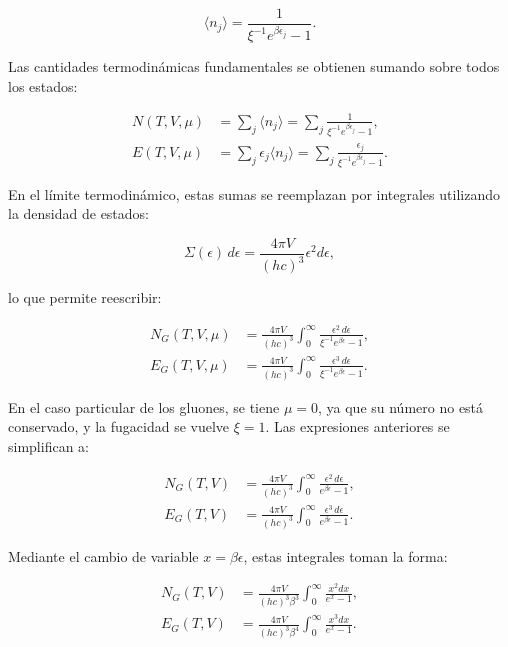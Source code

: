 \begin{equation}
\langle n_j \rangle = \frac{1}{\xi^{-1} e^{\beta \epsilon_j} - 1}.
\end{equation}

Las cantidades termodinámicas fundamentales se obtienen sumando sobre todos los estados:

\begin{align}
N(T,V,\mu) &= \sum_j \langle n_j \rangle = \sum_j \frac{1}{\xi^{-1} e^{\beta \epsilon_j} - 1}, \label{eq-BE-Ntotal} \\
E(T,V,\mu) &= \sum_j \epsilon_j \langle n_j \rangle = \sum_j \frac{\epsilon_j}{\xi^{-1} e^{\beta \epsilon_j} - 1}. \label{eq-BE-Etotal}
\end{align}

\break

En el límite termodinámico, estas sumas se reemplazan por integrales utilizando la densidad de estados:

\begin{equation}
\Sigma(\epsilon) \, d\epsilon = \frac{4\pi V}{(hc)^3} \epsilon^2 d\epsilon,
\end{equation}

lo que permite reescribir:

\begin{align}
{N}_{G}(T,V,\mu) &= \frac{4\pi V}{(hc)^3} \int_0^\infty \frac{\epsilon^2 \, d\epsilon}{\xi^{-1} e^{\beta \epsilon} - 1}, \label{eq-BE-Ntotalint} \\
{E}_{G}(T,V,\mu) &= \frac{4\pi V}{(hc)^3} \int_0^\infty \frac{\epsilon^3 \, d\epsilon}{\xi^{-1} e^{\beta \epsilon} - 1}. \label{eq-BE-Etotalint}
\end{align}

En el caso particular de los gluones, se tiene \( \mu = 0 \), ya que su número no está conservado, y la fugacidad se vuelve \( \xi = 1 \). Las expresiones anteriores se simplifican a:

\begin{align}
{N}_{G}(T,V) &= \frac{4\pi V}{(hc)^3} \int_0^\infty \frac{\epsilon^2 \, d\epsilon}{e^{\beta \epsilon} - 1}, \label{eq-BE-Ntotalintnofug} \\
{E}_{G}(T,V) &= \frac{4\pi V}{(hc)^3} \int_0^\infty \frac{\epsilon^3 \, d\epsilon}{e^{\beta \epsilon} - 1}. \label{eq-BE-Etotalintnofug}
\end{align}

Mediante el cambio de variable \( x = \beta \epsilon \), estas integrales toman la forma:

\begin{align}
{N}_{G}(T,V) &= \frac{4\pi V}{(hc)^3 \beta^3} \int_0^\infty \frac{x^2 dx}{e^x - 1}, \label{eq-BE-Ntotalintnofug-x} \\
{E}_{G}(T,V) &= \frac{4\pi V}{(hc)^3 \beta^4} \int_0^\infty \frac{x^3 dx}{e^x - 1}. \label{eq-BE-Etotalintnofug-x}
\end{align}

